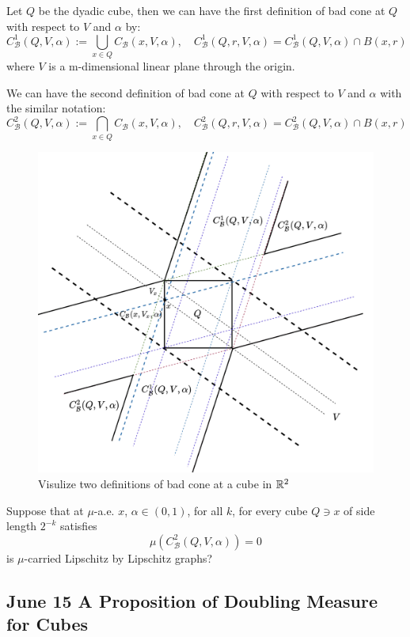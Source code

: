 \begin{definition} Let $Q$ be the dyadic cube, then we can have the first definition of bad cone at $Q$ with respect to $V$ and $\alpha$ by:
    $$C^1_{\mathcal{B}}(Q, V, \alpha) := \bigcup_{x\in Q} C_\mathcal{B}(x, V, \alpha), \quad C^1_{\mathcal{B}}(Q, r, V, \alpha) = C^1_{\mathcal{B}}(Q, V, \alpha) \cap B(x,r)$$
    where $V$ is a m-dimensional linear plane through the origin. 
\end{definition}

\begin{definition}
    We can have the second definition of bad cone at $Q$ with respect to $V$ and $\alpha$ with the similar notation:
    $$C^2_{\mathcal{B}}(Q, V, \alpha) := \bigcap_{x\in Q} C_\mathcal{B}(x, V, \alpha), \quad
    C^2_{\mathcal{B}}(Q, r, V, \alpha) = C^2_{\mathcal{B}}(Q, V, \alpha) \cap B(x,r)
    $$
\end{definition}
\begin{figure}[H]
    \centering
    \includegraphics[width=.66\textwidth]{images/cubebadconeDef.png}
    \caption{Visulize two definitions of bad cone at a cube in $\mathbb{R}^2$}
\end{figure}

\begin{problem}
    Suppose that at $\mu$-a.e. $x$, $\alpha\in(0, 1)$, for all $k$, for every cube $Q\ni x$ of side length $2^{-k}$ satisfies
    $$
    \mu(C^2_\mathcal{B}(Q, V, \alpha)) = 0
    $$ 
    is $\mu$-carried Lipschitz by Lipschitz graphs?
\end{problem}

\newpage
\subsection{June 15 A Proposition of Doubling Measure for Cubes}

